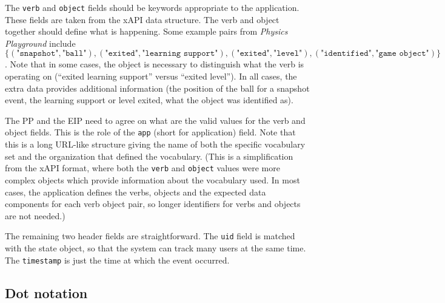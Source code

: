 \documentclass{article}
\begin{document}
  The \texttt{verb} and \texttt{object} fields should be keywords
  appropriate to the application.  These fields are taken from the
  xAPI \cite{xAPI} data structure.  The verb and object together
  should define what is happening.  Some example pairs from
  \textit{Physics Playground} include $\{ (\texttt{"snapshot"},
  \texttt{"ball"}), (\texttt{"exited"}, \texttt{"learning support"}), 
  (\texttt{"exited"}, \texttt{"level"}), (\texttt{"identified"},
  \texttt{"game object"}) \}$.  Note that in some cases, the object is
  necessary to distinguish what the verb is operating on (``exited
  learning support'' versus ``exited level'').  In all cases, the
  extra data provides additional information (the position of the ball
  for a snapshot event, the learning support or level exited, what the
  object was identified as).

  The PP and the EIP need to agree on what are the valid values for
  the verb and object fields.  This is the role of the \texttt{app}
  (short for application) field.  Note that this is a long URL-like
  structure giving the name of both the specific vocabulary set and
  the organization that defined the vocabulary.  (This is a
  simplification from the xAPI format, where both the \texttt{verb}
  and \texttt{object} values were more complex objects which provide
  information about the vocabulary used.  In most cases, the 
  application defines the verbs, objects and the expected data
  components for each verb object pair, so longer identifiers for
  verbs and objects are not needed.)

  The remaining two header fields are straightforward.  The
  \texttt{uid} field is matched with the state object, so that the
  system can track many users at the same time.  The
  \texttt{timestamp} is just the time at which the event occurred.

  \subsection{Dot notation}
  \label{sub:dot}
\end{document}
